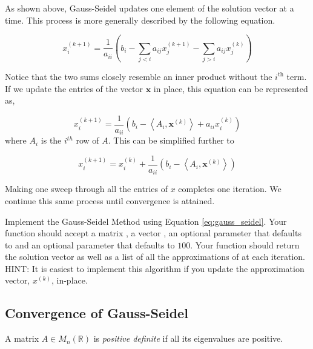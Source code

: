 As shown above, Gauss-Seidel updates one element of the solution vector at a time.
This process is more generally described by the following equation.

\begin{equation} \label{eq:gauss_seidel_full}
x^{(k+1)}_i = \frac{1}{a_{ii}} \left (b_i - \sum_{j < i}a_{ij}x^{(k+1)}_j - \sum_{j > i}a_{ij}x^{(k)}_j \right )
\end{equation}

Notice that the two sums closely resemble an inner product without the
$i^{\text{th}}$ term. If we update the entries of the vector $\mathbf{x}$ in place,
this equation can be represented as,

$$
x^{(k+1)}_i = \frac{1}{a_{ii}} \left ( b_i - \left < A_i, \mathbf{x}^{(k)} \right > + a_{ii}x^{(k)}_i \right )
$$
where $A_i$ is the $i^{th}$ row of $A$. This can be simplified further to

\begin{equation} \label{eq:gauss_seidel}
x^{(k+1)}_i = x^{(k)}_i + \frac{1}{a_{ii}} \left ( b_i - \left < A_i, \mathbf{x}^{(k)}\right >\right)
\end{equation}

Making one sweep through all the entries of $x$ completes one iteration. We
continue this same process until convergence is attained.

\begin{problem} \label{prob:gauss_seidel}
Implement the Gauss-Seidel Method using Equation \ref{eq:gauss_seidel}. Your
function should accept a matrix , a vector , an optional parameter
 that defaults to  and an optional parameter  that
defaults to $100$. Your function should return the solution vector  as
well as a list of all the approximations of  at each iteration. HINT: It is
easiest to implement this algorithm if you update the approximation vector, $x^{(k)}$, in-place.
\end{problem}

\subsection*{Convergence of Gauss-Seidel} %

\begin{definition}
    A matrix $A \in M_n(\mathbb{R})$ is \emph{positive definite} if all its
    eigenvalues are positive.
\end{definition}


